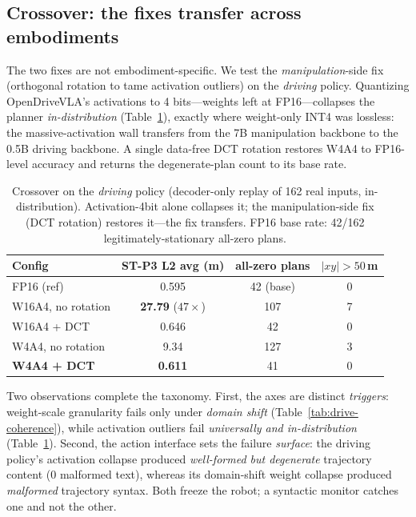 \documentclass[conference]{IEEEtran}
\begin{document}
\subsection{Crossover: the fixes transfer across embodiments}
The two fixes are not embodiment-specific. We test the \emph{manipulation}-side fix (orthogonal
rotation to tame activation outliers) on the \emph{driving} policy. Quantizing OpenDriveVLA's
activations to 4 bits---weights left at FP16---collapses the planner \emph{in-distribution}
(Table~\ref{tab:crossover}), exactly where weight-only INT4 was lossless: the massive-activation wall
transfers from the 7B manipulation backbone to the 0.5B driving backbone. A single data-free DCT
rotation restores W4A4 to FP16-level accuracy and returns the degenerate-plan count to its base rate.

\begin{table}[t]\centering
\caption{Crossover on the \emph{driving} policy (decoder-only replay of 162 real inputs,
in-distribution). Activation-4bit alone collapses it; the manipulation-side fix (DCT rotation)
restores it---the fix transfers. FP16 base rate: 42/162 legitimately-stationary all-zero plans.}
\label{tab:crossover}
\begin{tabular}{lccc}
\toprule
Config & ST-P3 L2 avg (m) & all-zero plans & $|xy|{>}50$\,m \\
\midrule
FP16 (ref)          & 0.595 & 42 (base) & 0 \\
W16A4, no rotation  & \textbf{27.79} ($47\times$) & 107 & 7 \\
W16A4 + DCT         & 0.646 & 42 & 0 \\
W4A4, no rotation   & 9.34  & 127 & 3 \\
\textbf{W4A4 + DCT} & \textbf{0.611} & 41 & 0 \\
\bottomrule
\end{tabular}
\end{table}
Two observations complete the taxonomy. First, the axes are distinct \emph{triggers}: weight-scale
granularity fails only under \emph{domain shift} (Table~\ref{tab:drive-coherence}), while activation
outliers fail \emph{universally and in-distribution} (Table~\ref{tab:crossover}). Second, the action
interface sets the failure \emph{surface}: the driving policy's activation collapse produced
\emph{well-formed but degenerate} trajectory content ($0$ malformed text), whereas its
domain-shift weight collapse produced \emph{malformed} trajectory syntax. Both freeze the robot; a
syntactic monitor catches one and not the other.
\end{document}
